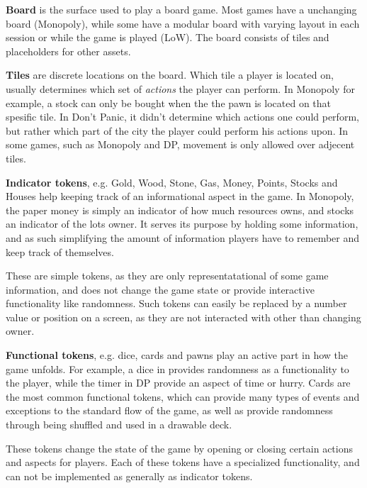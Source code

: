 \textbf{Board} is the surface used to play a board game. Most games have a unchanging board (Monopoly), while some have a modular board with varying layout in each session or while the game is played (LoW). The board consists of tiles and placeholders for other assets.

\textbf{Tiles} are discrete locations on the board. Which tile a player is located on, usually determines which set of \emph{actions} the player can perform. In Monopoly for example, a stock can only be bought when the the pawn is located on that spesific tile. In Don't Panic, it didn't determine which actions one could perform, but rather which part of the city the player could perform his actions upon. In some games, such as Monopoly and DP, movement is only allowed over adjecent tiles.

\textbf{Indicator tokens}, e.g. Gold, Wood, Stone, Gas, Money, Points, Stocks and Houses help keeping track of an informational aspect in the game. In Monopoly, the paper money is simply an indicator of how much resources owns, and stocks an indicator of the lots owner. It serves its purpose by holding some information, and as such simplifying the amount of information players have to remember and keep track of themselves.

These are simple tokens, as they are only representatational of some game information, and does not change the game state or provide interactive functionality like randomness. Such tokens can easily be replaced by a number value or position on a screen, as they are not interacted with other than changing owner.

\textbf{Functional tokens}, e.g. dice, cards and pawns play an active part in how the game unfolds. For example, a dice in provides randomness as a functionality to the player, while the timer in DP provide an aspect of time or hurry. Cards are the most common functional tokens, which can provide many types of events and exceptions to the standard flow of the game, as well as provide randomness through being shuffled and used in a drawable deck.

These tokens change the state of the game by opening or closing certain actions and aspects for players. Each of these tokens have a specialized functionality, and can not be implemented as generally as indicator tokens.

\newpage
